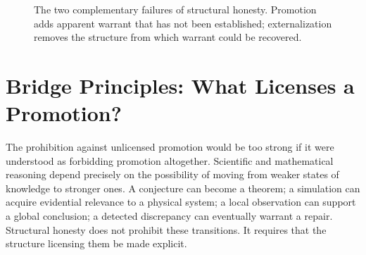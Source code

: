 \documentclass[11pt]{article}
\begin{document}
\begin{figure}[ht]
\centering
{}
\caption{The two complementary failures of structural honesty. Promotion adds apparent warrant that has not been established; externalization removes the structure from which warrant could be recovered.}
\label{fig:promotion-externalization}
\end{figure}

\section{Bridge Principles: What Licenses a Promotion?}
\label{sec:bridge}

The prohibition against unlicensed promotion would be too strong if it were understood as forbidding promotion altogether. Scientific and mathematical reasoning depend precisely on the possibility of moving from weaker states of knowledge to stronger ones. A conjecture can become a theorem; a simulation can acquire evidential relevance to a physical system; a local observation can support a global conclusion; a detected discrepancy can eventually warrant a repair. Structural honesty does not prohibit these transitions. It requires that the structure licensing them be made explicit.
\end{document}
